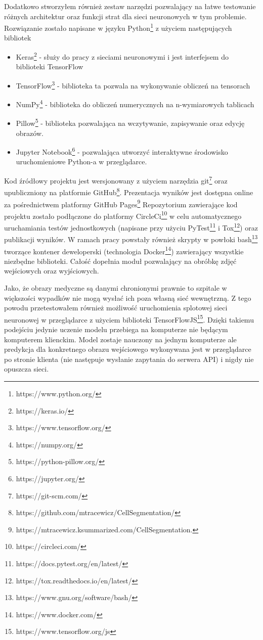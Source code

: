 \documentclass{article}
\begin{document}
Dodatkowo stworzyłem również zestaw narzędzi pozwalający na łatwe testowanie różnych architektur oraz funkcji strat dla sieci neuronowych w tym problemie.
Rozwiązanie zostało napisane w języku Python\footnote{https://www.python.org/} z użyciem następujących bibliotek
\begin{itemize}
  \item Keras\footnote{https://keras.io/} - służy do pracy z sieciami neuronowymi i jest interfejsem do biblioteki TensorFlow
  \item TensorFlow\footnote{https://www.tensorflow.org/} - biblioteka ta pozwala na wykonywanie obliczeń na tensorach
  \item NumPy\footnote{https://numpy.org/} - biblioteka do obliczeń numerycznych na n-wymiarowych tablicach
  \item Pillow\footnote{https://python-pillow.org/} - biblioteka pozwalająca na wczytywanie, zapisywanie oraz edycję obrazów.
  \item Jupyter Notebook\footnote{https://jupyter.org/} - pozwalająca utworzyć interaktywne środowisko uruchomieniowe Python-a w przeglądarce.
\end{itemize}
Kod źródłowy projektu jest wersjonowany z użyciem narzędzia git\footnote{https://git-scm.com/} \newline oraz upubliczniony na platformie GitHub\footnote{https://github.com/mtracewicz/CellSegmentation/}.
Prezentacja wyników jest dostępna online za pośrednictwem platformy GitHub Pages\footnote{ https://mtracewicz.ksummarized.com/CellSegmentation.}
Repozytorium zawierające kod projektu zostało podłączone do platformy CircleCi\footnote{https://circleci.com/} w celu automatycznego uruchamiania testów jednostkowych (napisane przy użyciu PyTest\footnote{https://docs.pytest.org/en/latest/} i Tox\footnote{https://tox.readthedocs.io/en/latest/}) oraz publikacji wyników.
W ramach pracy powstały również skrypty w powłoki bash\footnote{https://www.gnu.org/software/bash/} tworzące kontener deweloperski (technologia Docker\footnote{https://www.docker.com/}) zawierający wszystkie niezbędne biblioteki.
Całość dopełnia moduł pozwalający na obróbkę zdjęć wejściowych oraz wyjściowych.

Jako, że obrazy medyczne są danymi chronionymi prawnie to szpitale w większości wypadków nie mogą wysłać ich poza własną sieć wewnętrzną.
Z tego powodu przetestowałem również możliwość uruchomienia splotowej sieci neuronowej w przeglądarce z użyciem biblioteki TensorFlowJS\footnote{https://www.tensorflow.org/js}.
Dzięki takiemu podejściu jedynie uczenie modelu przebiega na komputerze nie będącym komputerem klienckim.
Model zostaje nauczony na jednym komputerze ale predykcja dla konkretnego obrazu wejściowego wykonywana jest w przeglądarce po stronie klienta (nie następuje wysłanie zapytania do serwera API) i nigdy nie opuszcza sieci.
\end{document}
